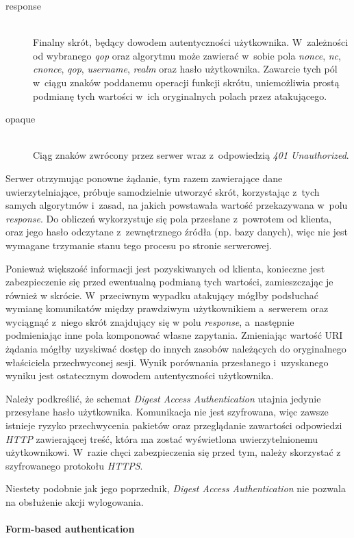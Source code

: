 \documentclass[11pt]{aghdpl}
\begin{document}
\begin{description}
\item[response] \hfill \\
Finalny skrót, będący dowodem autentyczności użytkownika. W~zależności od wybranego \emph{qop} oraz algorytmu może zawierać w~sobie pola \emph{nonce}, \emph{nc}, \emph{cnonce}, \emph{qop}, \emph{username}, \emph{realm} oraz hasło użytkownika. Zawarcie tych pól w~ciągu znaków poddanemu operacji funkcji skrótu, uniemożliwia prostą podmianę tych wartości w~ich oryginalnych polach przez atakującego.
\item[opaque] \hfill \\
Ciąg znaków zwrócony przez serwer wraz z~odpowiedzią \emph{401 Unauthorized}.
\end{description}

Serwer otrzymując ponowne żądanie, tym razem zawierające dane uwierzytelniające, próbuje samodzielnie utworzyć skrót, korzystając z~tych samych algorytmów i~zasad, na jakich powstawała wartość przekazywana w~polu \emph{response}. Do obliczeń wykorzystuje się pola przesłane z~powrotem od klienta, oraz jego hasło odczytane z~zewnętrznego źródła (np. bazy danych), więc nie jest wymagane trzymanie stanu tego procesu po stronie serwerowej.

Ponieważ większość informacji jest pozyskiwanych od klienta, konieczne jest zabezpieczenie się przed ewentualną podmianą tych wartości, zamieszczając je również w skrócie. W~przeciwnym wypadku atakujący mógłby podsłuchać wymianę komunikatów między prawdziwym użytkownikiem a~serwerem oraz wyciągnąć z~niego skrót znajdujący się w polu \emph{response}, a~następnie podmieniając inne pola komponować własne zapytania. Zmieniając wartość URI żądania mógłby uzyskiwać dostęp do innych zasobów należących do oryginalnego właściciela przechwyconej sesji. Wynik porównania przesłanego i~uzyskanego wyniku jest ostatecznym dowodem autentyczności użytkownika.

Należy podkreślić, że schemat \emph{Digest Access Authentication} utajnia jedynie przesyłane hasło użytkownika. Komunikacja nie jest szyfrowana, więc zawsze istnieje ryzyko przechwycenia pakietów oraz przeglądanie zawartości odpowiedzi \emph{HTTP} zawierającej treść, która ma zostać wyświetlona uwierzytelnionemu użytkownikowi. W~razie chęci zabezpieczenia się przed tym, należy skorzystać z szyfrowanego protokołu \emph{HTTPS}.

Niestety podobnie jak jego poprzednik, \emph{Digest Access Authentication} nie pozwala na obsłużenie akcji wylogowania.

\paragraph{Form-based authentication}
\end{document}
